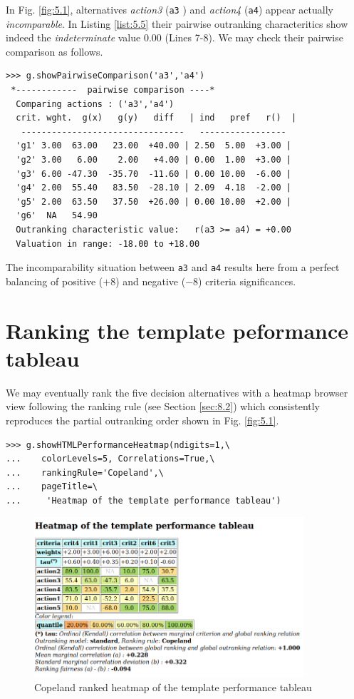In Fig. \ref{fig:5.1}, alternatives \emph{action3} (\texttt{a3} ) and \emph{action4} (\texttt{a4}) appear actually \emph{incomparable}. In Listing \ref{list:5.5} their pairwise outranking characteritics show indeed the \emph{indeterminate} value $0.00$ (Lines 7-8). We may check their pairwise comparison as follows.
\begin{lstlisting}
>>> g.showPairwiseComparison('a3','a4')
 *------------  pairwise comparison ----*
  Comparing actions : ('a3','a4')
  crit. wght.  g(x)   g(y)   diff   | ind   pref   r()  | 
   --------------------------------   -----------------
  'g1' 3.00  63.00   23.00  +40.00 | 2.50  5.00  +3.00 | 
  'g2' 3.00   6.00    2.00   +4.00 | 0.00  1.00  +3.00 | 
  'g3' 6.00 -47.30  -35.70  -11.60 | 0.00 10.00  -6.00 | 
  'g4' 2.00  55.40   83.50  -28.10 | 2.09  4.18  -2.00 | 
  'g5' 2.00  63.50   37.50  +26.00 | 0.00 10.00  +2.00 | 
  'g6'  NA   54.90
  Outranking characteristic value:   r(a3 >= a4) = +0.00
  Valuation in range: -18.00 to +18.00
\end{lstlisting}
The incomparability situation between \texttt{a3} and \texttt{a4} results here from a perfect balancing of positive ($+8$) and negative ($-8$) criteria significances.

\section{Ranking the template peformance tableau}
\label{sec:5.7}

We may eventually rank the five decision alternatives with a heatmap browser view following the \Copeland ranking rule (see Section \ref{sec:8.2}) which consistently reproduces the partial outranking order shown in Fig. \ref{fig:5.1}. 
\begin{lstlisting}
>>> g.showHTMLPerformanceHeatmap(ndigits=1,\
...    colorLevels=5, Correlations=True,\
...    rankingRule='Copeland',\
...    pageTitle=\
...     'Heatmap of the template performance tableau')
\end{lstlisting}
\begin{figure}[h]
\includegraphics[width=10cm]{Figures/templateHeatmapCop.png}
\caption{Copeland ranked heatmap of the template performance tableau}
\label{fig:5.2}       %
\end{figure}

